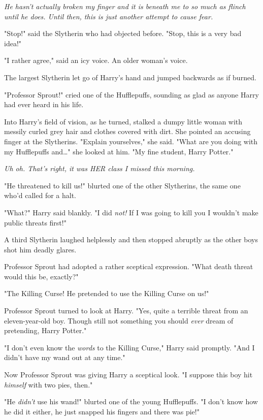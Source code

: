 \emph{He hasn't actually broken my finger and it is beneath me to so much as 
flinch until he does. Until then, this is just another attempt to cause fear.}

"Stop!" said the Slytherin who had objected before. "Stop, this is a very bad 
idea!"

"I rather agree," said an icy voice. An older woman's voice.

The largest Slytherin let go of Harry's hand and jumped backwards as if burned.

"Professor Sprout!" cried one of the Hufflepuffs, sounding as glad as anyone 
Harry had ever heard in his life.

Into Harry's field of vision, as he turned, stalked a dumpy little woman with 
messily curled grey hair and clothes covered with dirt. She pointed an accusing 
finger at the Slytherins. "Explain yourselves," she said. "What are you doing 
with my Hufflepuffs and{\ldots}" she looked at him. "My fine student, Harry 
Potter."

\emph{Uh oh. That's right, it was HER class I missed this morning.}

"He threatened to kill us!" blurted one of the other Slytherins, the same one 
who'd called for a halt.

"What?" Harry said blankly. "I did \emph{not!} If I was going to kill you I 
wouldn't make public threats first!"

A third Slytherin laughed helplessly and then stopped abruptly as the other 
boys shot him deadly glares.

Professor Sprout had adopted a rather sceptical expression. "What death threat 
would this be, exactly?"

"The Killing Curse! He pretended to use the Killing Curse on us!"

Professor Sprout turned to look at Harry. "Yes, quite a terrible threat from an 
eleven-year-old boy. Though still not something you should \emph{ever} dream of 
pretending, Harry Potter."

"I don't even know the \emph{words} to the Killing Curse," Harry said promptly. 
"And I didn't have my wand out at any time."

Now Professor Sprout was giving Harry a sceptical look. "I suppose this boy hit 
\emph{himself} with two pies, then."

"He \emph{didn't} use his wand!" blurted one of the young Hufflepuffs. "I don't 
know how he did it either, he just snapped his fingers and there was pie!"

